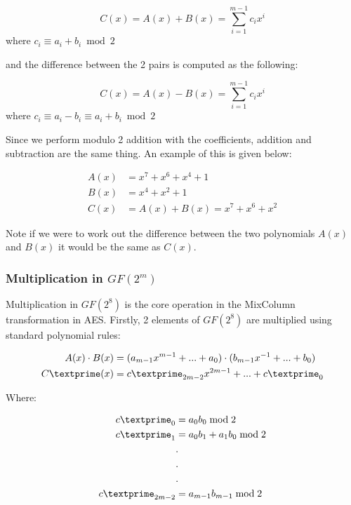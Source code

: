 \begin{center}
$$C(x) = A(x) + B(x) = \sum_{i=1}^{m-1} c_ix^i$$ where
$c_i \equiv a_i + b_i \bmod 2$
\end{center}

and the difference between the 2 pairs is computed as the following:

\begin{center}
$$C(x) = A(x) - B(x) = \sum_{i=1}^{m-1} c_ix^i$$ where
$c_i \equiv a_i - b_i \equiv a_i + b_i \bmod 2$
\end{center}

Since we perform modulo 2 addition with the coefficients, addition and subtraction are the same thing. An example of this is given below:

\begin{center}
\begin{align*}
A(x) &= x^7 + x^6 + x^4  + 1 \\
B(x) &= x^4 + x^2 + 1 \\
C(x) &= A(x) + B(x) = x^7 + x^6 + x^2
\end{align*}
\end{center}

Note if we were to work out the difference between the two polynomials $A(x)$ and $B(x)$ it would be the same as $C(x)$.

\subsubsection{Multiplication in $GF(2^m)$}

Multiplication in $GF(2^8)$ is the core operation in the MixColumn transformation in AES. Firstly, 2 elements of $GF(2^8)$ are multiplied using standard polynomial rules:

\begin{center}
\begin{align*}
A(x) \cdot B(x) &= (a_{m-1}x^{m-1} + ... + a_0) \cdot (b_{m-1}x^{-1} + ... + b_0) \\
C\textprime(x) &= c\textprime_{2m-2}x^{2m-1} + ... + c\textprime_0
\end{align*}

Where:

\begin{align*}
c\textprime_0 &= a_0b_0 \bmod 2 \\
c\textprime_1 &= a_0b_1 + a_1b_0 \bmod 2 \\
&. \\
&. \\
&. \\
c\textprime_{2m-2} &= a_{m-1}b_{m-1} \bmod 2
\end{align*}

\end{center}


